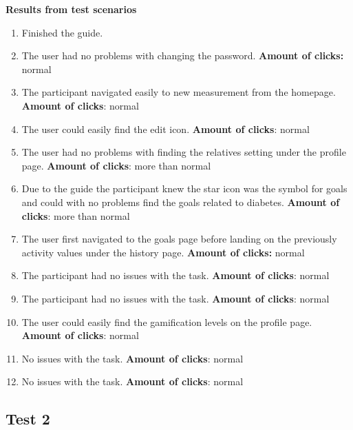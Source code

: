 \noindent\textbf{Results from test scenarios}
\begin{enumerate}
\item Finished the guide.
\item The user had no problems with changing the password.
\subitem \textbf{Amount of clicks:} normal
\item The participant navigated easily to new measurement from the homepage.
\subitem \textbf{Amount of clicks}: normal
\item The user could easily find the edit icon.
\subitem \textbf{Amount of clicks}: normal
\item  The user had no problems with finding the relatives setting under the profile page.
\subitem \textbf{Amount of clicks}: more than normal
\item Due to the guide the participant knew the star icon was the symbol for goals and could with no problems find the goals related to diabetes.
\subitem \textbf{Amount of clicks}: more than normal
\item The user first navigated to the goals page before landing on the previously activity values under the history page.
\subitem \textbf{Amount of clicks:} normal 
\item The participant had no issues with the task. 
\subitem \textbf{Amount of clicks}: normal 
\item The participant had no issues with the task.
\subitem \textbf{Amount of clicks}: normal 
\item The user could easily find the gamification levels on the profile page.
\subitem \textbf{Amount of clicks}: normal 
\item No issues with the task.
\subitem \textbf{Amount of clicks}: normal 
\item No issues with the task.
\subitem \textbf{Amount of clicks}: normal 
\end{enumerate}
	




\subsection{Test 2}

